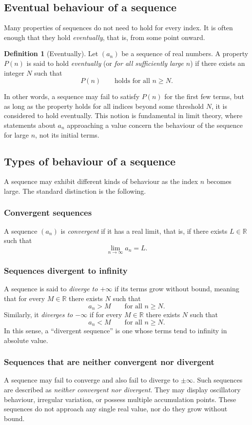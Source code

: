 \documentclass[11pt,a4paper]{article}
\theoremstyle{definition} \newtheorem{definition}{Definition} \theoremstyle{plain} \newtheorem{theorem}{Theorem}
\begin{document}
\subsection{Eventual behaviour of a sequence}
Many properties of sequences do not need to hold for every index.
It is often enough that they hold \emph{eventually}, that is, from some point onward.
\begin{definition}[Eventually] Let $(a_n)$ be a sequence of real numbers.
A property $P(n)$ is said to hold \emph{eventually} (or \emph{for all sufficiently large $n$}) if there exists an integer $N$ such that
\[ P(n) \qquad \text{holds for all } n \ge N. \]
\end{definition}
In other words, a sequence may fail to satisfy $P(n)$ for the first few terms, but as long as the property holds for all indices beyond some threshold $N$, it is considered to hold eventually.
This notion is fundamental in limit theory, where statements about $a_n$ approaching a value concern the behaviour of the sequence for large $n$, not its initial terms.
\subsection{Types of behaviour of a sequence}
A sequence may exhibit different kinds of behaviour as the index $n$ becomes large.
The standard distinction is the following.
\subsubsection*{Convergent sequences}
A sequence $(a_n)$ is \emph{convergent} if it has a real limit, that is, if there exists $L\in\mathbb{R}$ such that
\[ \lim_{n\to\infty} a_n = L. \]
\subsubsection*{Sequences divergent to infinity}
A sequence is said to \emph{diverge to $+\infty$} if its terms grow without bound, meaning that for every $M\in\mathbb{R}$ there exists $N$ such that
\[ a_n > M \qquad \text{for all } n \ge N. \]
Similarly, it \emph{diverges to $-\infty$} if for every $M\in\mathbb{R}$ there exists $N$ such that
\[ a_n < M \qquad \text{for all } n \ge N. \]
In this sense, a ``divergent sequence'' is one whose terms tend to infinity in absolute value.
\subsubsection*{Sequences that are neither convergent nor divergent}
A sequence may fail to converge and also fail to diverge to $\pm\infty$.
Such sequences are described as \emph{neither convergent nor divergent}.
They may display oscillatory behaviour, irregular variation, or possess multiple accumulation points.
These sequences do not approach any single real value, nor do they grow without bound.
\end{document}
